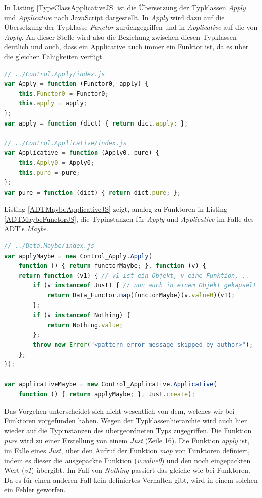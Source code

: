 \documentclass[
12pt,
ngerman,
oneside]
{scrbook} %
\begin{document}
In Listing \ref{TypeClassApplicativeJS} ist die Übersetzung der Typklassen \emph{Apply} und \emph{Applicative} nach JavaScript dargestellt. In \emph{Apply} wird dazu auf die Übersetzung der Typklasse \emph{Functor} zurückgegriffen und in \emph{Applicative} auf die von \emph{Apply}. An dieser Stelle wird also die Beziehung zwischen diesen Typklassen deutlich und auch, dass ein Applicative auch immer ein Funktor ist, da es über die gleichen Fähigkeiten verfügt.

\begin{lstlisting}[language=javascript, style=numbered-and-boxed, caption=Übersetzung der Typklassen \emph{Apply} und \emph{Applicative}, label=TypeClassApplicativeJS]
// ../Control.Apply/index.js
var Apply = function (Functor0, apply) {
	this.Functor0 = Functor0;
	this.apply = apply;
};
var apply = function (dict) { return dict.apply; };

// ../Control.Applicative/index.js
var Applicative = function (Apply0, pure) {
	this.Apply0 = Apply0;
	this.pure = pure;
};
var pure = function (dict) { return dict.pure; };
\end{lstlisting}

Listing \ref{ADTMaybeApplicativeJS} zeigt, analog zu Funktoren in Listing \ref{ADTMaybeFunctorJS}, die Typinstanzen für \emph{Apply} und \emph{Applicative} im Falle des ADT's \emph{Maybe}.

\begin{lstlisting}[language=javascript, style=numbered-and-boxed, caption=Übersetzung der Typinstanzen für \emph{Maybe}, label=ADTMaybeApplicativeJS]
// ../Data.Maybe/index.js
var applyMaybe = new Control_Apply.Apply(
	function () { return functorMaybe; }, function (v) {
	return function (v1) { // v1 ist ein Objekt, v eine Funktion, ..
		if (v instanceof Just) { // nun auch in einem Objekt gekapselt
			return Data_Functor.map(functorMaybe)(v.value0)(v1);
		};
		if (v instanceof Nothing) {
			return Nothing.value;
		};
		throw new Error("<pattern error message skipped by author>");
	};
});

var applicativeMaybe = new Control_Applicative.Applicative(
	function () { return applyMaybe; }, Just.create);
\end{lstlisting}

Das Vorgehen unterscheidet sich nicht wesentlich von dem, welches wir bei Funktoren vorgefunden haben. Wegen der Typklassenhierarchie wird auch hier wieder auf die Typinstanzen des übergeordneten Typs zugegriffen. Die Funktion \emph{pure} wird zu einer Erstellung von einem \emph{Just} (Zeile 16). Die Funktion \emph{apply} ist, im Falle eines \emph{Just}, über den Aufruf der Funktion \emph{map} von Funktoren definiert, indem es dieser die ausgepackte Funktion (\emph{v.value0}) und den noch eingepackten Wert (\emph{v1}) übergibt. Im Fall von \emph{Nothing} passiert das gleiche wie bei Funktoren. Da es für einen anderen Fall kein definiertes Verhalten gibt, wird in einem solchen ein Fehler geworfen.
\end{document}
